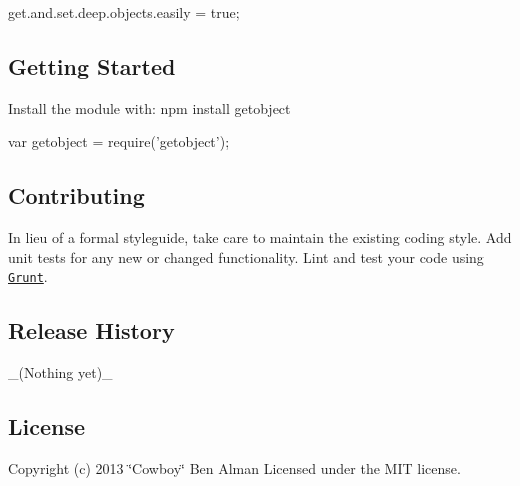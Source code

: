 get.\+and.\+set.\+deep.\+objects.\+easily = true;

\subsection*{Getting Started}

Install the module with\+: {\ttfamily npm install getobject}


\begin{DoxyCode}
var getobject = require('getobject');
\end{DoxyCode}


\subsection*{Contributing}

In lieu of a formal styleguide, take care to maintain the existing coding style. Add unit tests for any new or changed functionality. Lint and test your code using \href{http://gruntjs.com/}{\tt Grunt}.

\subsection*{Release History}

\+\_\+(\+Nothing yet)\+\_\+

\subsection*{License}

Copyright (c) 2013 \char`\"{}\+Cowboy\char`\"{} Ben Alman Licensed under the M\+IT license. 
